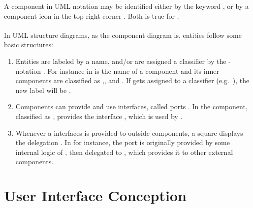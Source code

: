 A component in UML notation may be identified either by the keyword , or by a component icon in the top right corner \parencites[cf.][208]{ObjectManagementGroup.01.03.2015}. Both is true for . 

\paragraph{} In UML structure diagrams, as the component diagram is, entities follow some basic structures:

\begin{enumerate}
    \item Entities are labeled by a name, and/or are assigned a  classifier by the \ssay{:[classifier]}-notation  \parencite[cf.][125]{ObjectManagementGroup.01.03.2015}. For instance in   is the name of a component and its inner components are classified as ,, and . If  gets assigned to a classifier (e.g.~), the new label will be .
    
    \item Components can provide and use interfaces, called ports \parencite[cf.][182-184]{ObjectManagementGroup.01.03.2015}. In  the component, classified as , provides the interface , which is used by .
    
    \item Whenever a interfaces is provided to outside components, a square displays the delegation \parencite[cf.][212]{ObjectManagementGroup.01.03.2015}. In  for instance, the port  is originally provided by some internal logic of , then delegated to , which provides it to other external components. 
\end{enumerate}

\section{User Interface Conception}


